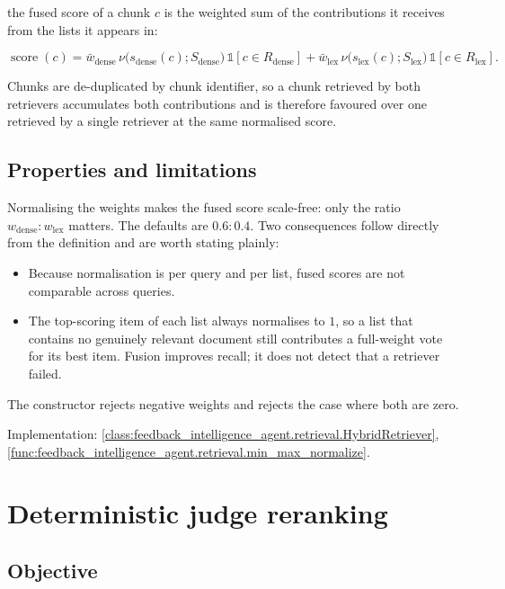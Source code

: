 the fused score of a chunk $c$ is the weighted sum of the contributions it
receives from the lists it appears in:

\begin{equation}
\operatorname{score}(c) =
\bar{w}_{\text{dense}}\,\nu\!\big(s_{\text{dense}}(c); S_{\text{dense}}\big)\,
  \mathbb{1}[c \in R_{\text{dense}}]
+ \bar{w}_{\text{lex}}\,\nu\!\big(s_{\text{lex}}(c); S_{\text{lex}}\big)\,
  \mathbb{1}[c \in R_{\text{lex}}].
\end{equation}

Chunks are de-duplicated by chunk identifier, so a chunk retrieved by both
retrievers accumulates both contributions and is therefore favoured over one
retrieved by a single retriever at the same normalised score.

\subsection*{Properties and limitations}

Normalising the weights makes the fused score scale-free: only the ratio
$w_{\text{dense}} : w_{\text{lex}}$ matters. The defaults are $0.6 : 0.4$. Two
consequences follow directly from the definition and are worth stating plainly:

\begin{itemize}[nosep]
  \item Because normalisation is per query and per list, fused scores are not
    comparable across queries.
  \item The top-scoring item of each list always normalises to $1$, so a list
    that contains no genuinely relevant document still contributes a
    full-weight vote for its best item. Fusion improves recall; it does not
    detect that a retriever failed.
\end{itemize}

The constructor rejects negative weights and rejects the case where both are
zero.

\medskip\noindent
Implementation: \cref{class:feedback_intelligence_agent.retrieval.HybridRetriever},
\cref{func:feedback_intelligence_agent.retrieval.min_max_normalize}.

\section{Deterministic judge reranking}
\label{sec:math-reranking}

\subsection*{Objective}


